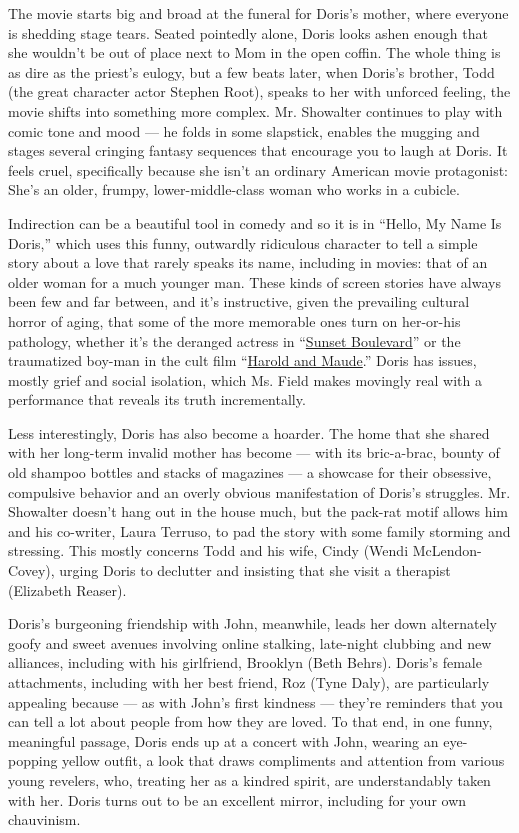 The movie starts big and broad at the funeral for Doris's mother, where
everyone is shedding stage tears. Seated pointedly alone, Doris looks
ashen enough that she wouldn't be out of place next to Mom in the open
coffin. The whole thing is as dire as the priest's eulogy, but a few
beats later, when Doris's brother, Todd (the great character actor
Stephen Root), speaks to her with unforced feeling, the movie shifts
into something more complex. Mr. Showalter continues to play with comic
tone and mood --- he folds in some slapstick, enables the mugging and
stages several cringing fantasy sequences that encourage you to laugh at
Doris. It feels cruel, specifically because she isn't an ordinary
American movie protagonist: She's an older, frumpy, lower-middle-class
woman who works in a cubicle.

Indirection can be a beautiful tool in comedy and so it is in ``Hello,
My Name Is Doris,'' which uses this funny, outwardly ridiculous
character to tell a simple story about a love that rarely speaks its
name, including in movies: that of an older woman for a much younger
man. These kinds of screen stories have always been few and far between,
and it's instructive, given the prevailing cultural horror of aging,
that some of the more memorable ones turn on her-or-his pathology,
whether it's the deranged actress in
``\href{http://www.tcm.com/this-month/article/357054\%7C373028/Sunset-Blvd-.html}{Sunset
Boulevard}'' or the traumatized boy-man in the cult film
``\href{https://www.youtube.com/watch?v=5mz3TkxJhPc}{Harold and
Maude}.'' Doris has issues, mostly grief and social isolation, which Ms.
Field makes movingly real with a performance that reveals its truth
incrementally.

Less interestingly, Doris has also become a hoarder. The home that she
shared with her long-term invalid mother has become --- with its
bric-a-brac, bounty of old shampoo bottles and stacks of magazines --- a
showcase for their obsessive, compulsive behavior and an overly obvious
manifestation of Doris's struggles. Mr. Showalter doesn't hang out in
the house much, but the pack-rat motif allows him and his co-writer,
Laura Terruso, to pad the story with some family storming and stressing.
This mostly concerns Todd and his wife, Cindy (Wendi McLendon-Covey),
urging Doris to declutter and insisting that she visit a therapist
(Elizabeth Reaser).

Doris's burgeoning friendship with John, meanwhile, leads her down
alternately goofy and sweet avenues involving online stalking,
late-night clubbing and new alliances, including with his girlfriend,
Brooklyn (Beth Behrs). Doris's female attachments, including with her
best friend, Roz (Tyne Daly), are particularly appealing because --- as
with John's first kindness --- they're reminders that you can tell a lot
about people from how they are loved. To that end, in one funny,
meaningful passage, Doris ends up at a concert with John, wearing an
eye-popping yellow outfit, a look that draws compliments and attention
from various young revelers, who, treating her as a kindred spirit, are
understandably taken with her. Doris turns out to be an excellent
mirror, including for your own chauvinism.

